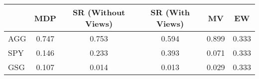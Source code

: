 \begin{tabular}{lccccc}
\toprule
{} &    MDP &  SR (Without Views) &  SR (With Views) &     MV &     EW \\
\midrule
AGG &  0.747 &               0.753 &            0.594 &  0.899 &  0.333 \\
SPY &  0.146 &               0.233 &            0.393 &  0.071 &  0.333 \\
GSG &  0.107 &               0.014 &            0.013 &  0.029 &  0.333 \\
\bottomrule
\end{tabular}
